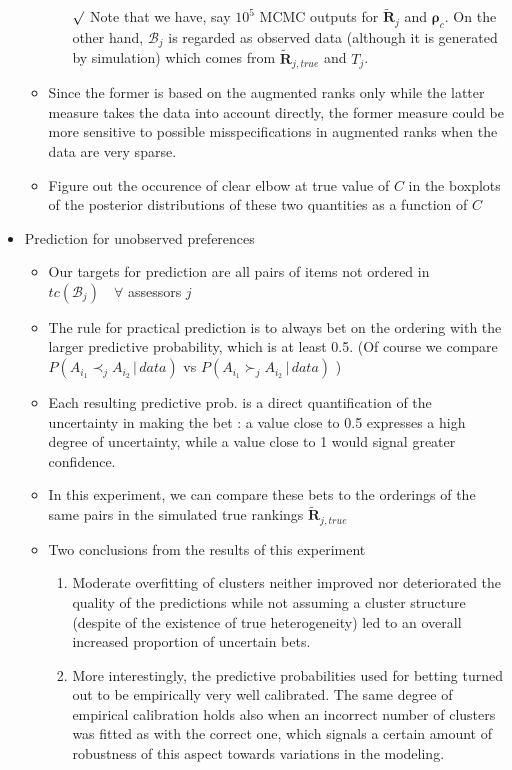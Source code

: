 \documentclass[12pt]{article}
\newcommand{\rmk}{$\surd$}
\begin{document}
\begin{itemize}
\begin{itemize}
\begin{enumerate}
            \item[\rmk] Note that we have, say $10^5$ MCMC outputs for $\tilde{\mathbf{R}}_j$ and $\boldsymbol{\rho}_c$. On the other hand, $\mathcal{B}_j$ is regarded as observed data (although it is generated by simulation) which comes from $\tilde{\mathbf{R}}_{j, true}$ and $T_j$. 
        \end{enumerate}
        \item Since the former is based on the augmented ranks only while the latter measure takes the data into account directly, the former measure could be more sensitive to possible misspecifications in augmented ranks when the data are very sparse.
        \item Figure out the occurence of clear elbow at true value of $C$ in the boxplots of the posterior distributions of these two quantities as a function of $C$
    \end{itemize}
    \item Prediction for unobserved preferences
    \begin{itemize}
        \item Our targets for prediction are all pairs of items not ordered in $tc(\mathcal{B}_j)\quad \forall$ assessors $j$
        \item The rule for practical prediction is to always bet on the ordering with the larger predictive probability, which is at least 0.5. (Of course we compare $P(A_{i_1}\prec_j A_{i_2}\,|\, data)$ vs $P(A_{i_1}\succ_j A_{i_2}\,|\, data)$ )
        \item Each resulting predictive prob. is a direct quantification of the uncertainty in making the bet : a value close to 0.5 expresses a high degree of uncertainty, while a value close to 1 would signal greater confidence. 
        \item In this experiment, we can compare these bets to the orderings of the same pairs in the simulated true rankings $\tilde{\mathbf{R}}_{j, true}$
        \item Two conclusions from the results of this experiment
        \begin{enumerate}
            \item Moderate overfitting of clusters neither improved nor deteriorated the quality of the predictions while not assuming a cluster structure (despite of the existence of true heterogeneity) led to an overall increased proportion of uncertain bets. 
            \item More interestingly, the predictive probabilities used for betting turned out to be empirically very well calibrated. The same degree of empirical calibration holds also when an incorrect number of clusters was fitted as with the correct one, which signals a certain amount of robustness of this aspect towards variations in the modeling. 

\end{enumerate}
\end{itemize}
\end{itemize}
\end{document}

